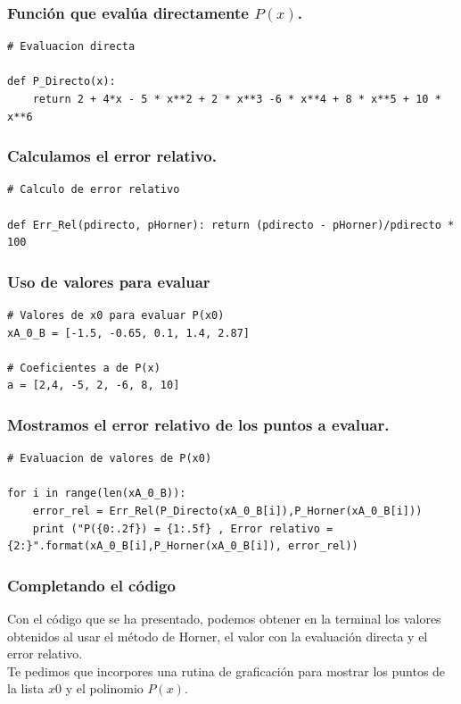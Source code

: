 \begin{frame}[fragile]
\frametitle{Función que evalúa directamente $P(x)$.}
\fontsize{14}{14}\selectfont
\begin{lstlisting}[caption=Evaluación directa de la función, style=codigopython]
# Evaluacion directa

def P_Directo(x):
    return 2 + 4*x - 5 * x**2 + 2 * x**3 -6 * x**4 + 8 * x**5 + 10 * x**6
\end{lstlisting}
\end{frame}
\begin{frame}[fragile]
\frametitle{Calculamos el error relativo.}
\begin{lstlisting}[caption=Evaluación del error relativo, style=codigopython]
# Calculo de error relativo

def Err_Rel(pdirecto, pHorner): return (pdirecto - pHorner)/pdirecto * 100
\end{lstlisting}
\end{frame}
\begin{frame}[fragile]
\frametitle{Uso de valores para evaluar}
\begin{lstlisting}[caption=Valores para evaluar, style=codigopython]
# Valores de x0 para evaluar P(x0)
xA_0_B = [-1.5, -0.65, 0.1, 1.4, 2.87]

# Coeficientes a de P(x)
a = [2,4, -5, 2, -6, 8, 10]
\end{lstlisting}
\end{frame}
\begin{frame}[fragile]
\frametitle{Mostramos el error relativo de los puntos a evaluar.}
\fontsize{14}{14}\selectfont
\begin{lstlisting}[caption=Error relativo calculado, style=codigopython]
# Evaluacion de valores de P(x0)

for i in range(len(xA_0_B)):
	error_rel = Err_Rel(P_Directo(xA_0_B[i]),P_Horner(xA_0_B[i]))
    print ("P({0:.2f}) = {1:.5f} , Error relativo = {2:}".format(xA_0_B[i],P_Horner(xA_0_B[i]), error_rel)) 
\end{lstlisting}
\end{frame}
\begin{frame}[fragile]
\frametitle{Completando el código}
Con el código que se ha presentado, podemos obtener en la terminal los valores obtenidos al usar el método de Horner, el valor con la evaluación directa y el error relativo.
\\
\bigskip
\pause
Te pedimos que incorpores una rutina de graficación para mostrar los puntos de la lista $x0$ y el polinomio $P(x)$.
\end{frame}
